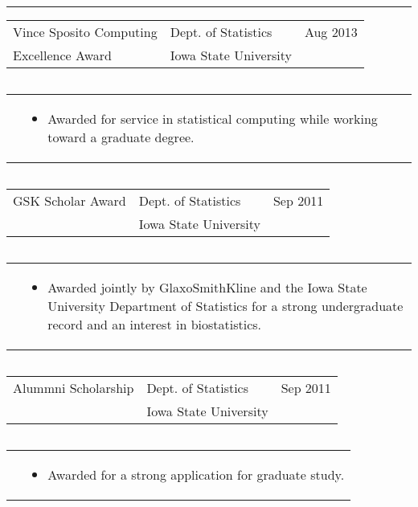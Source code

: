 \documentclass{article}
\newcommand{\q}{$\quad$ \newline}
\newcommand{\vl}{4.25}
\newcommand{\wl}{8.4}
\newcommand{\ww}{13}
\newcommand{\myrule}{\noindent \rule{\textwidth}{1pt}}
\begin{document}
\myrule

\noindent \begin{tabular}{@{}p{\vl cm}p{\wl cm}l@{}}
Vince Sposito Computing & Dept. of Statistics & Aug 2013 \\
Excellence Award & Iowa State University &
\end{tabular} \q

\noindent \begin{tabular}{@{}p{\vl cm}p{\ww cm}@{}}
& \begin{itemize}
\item Awarded for service in statistical computing while working toward a graduate degree.
\end{itemize}
\end{tabular} \q 

\noindent \begin{tabular}{@{}p{\vl cm}p{\wl cm}l@{}}
GSK Scholar Award & Dept. of Statistics & Sep 2011 \\
& Iowa State University &
\end{tabular} \q

\noindent \begin{tabular}{@{}p{\vl cm}p{\ww cm}@{}}
&\begin{itemize}
\item Awarded jointly by GlaxoSmithKline and the Iowa State University Department of Statistics for a strong undergraduate record and an interest in biostatistics.
\end{itemize}
\end{tabular} \q 

\noindent \begin{tabular}{@{}p{\vl cm}p{\wl cm}l@{}}
Alummni Scholarship & Dept. of Statistics & Sep 2011 \\
& Iowa State University &
\end{tabular} \q

\noindent \begin{tabular}{@{}p{\vl cm}p{\ww cm}@{}}
& \begin{itemize}
 \item Awarded for a strong application for graduate study.
\end{itemize}
\end{tabular} \q 

\end{document}
